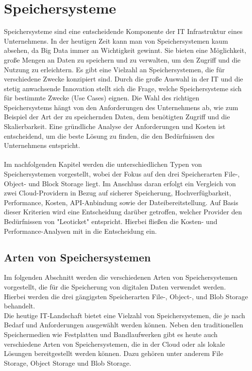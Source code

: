 \chapter{Speichersysteme}

Speichersysteme sind eine entscheidende Komponente der IT Infrastruktur eines Unternehmens. In der heutigen Zeit kann man von Speichersystemen kaum absehen, da Big Data immer an Wichtigkeit gewinnt. Sie bieten eine Möglichkeit, große Mengen an Daten zu speichern und zu verwalten, um den Zugriff und die Nutzung zu erleichtern. Es gibt eine Vielzahl an Speichersystemen, die für verschiedene Zwecke konzipiert sind. Durch die große Auswahl in der IT und die stetig anwachsende Innovation stellt sich die Frage, welche Speichersysteme sich für bestimmte Zwecke (Use Cases) eignen. Die Wahl des richtigen Speichersystems hängt von den Anforderungen des Unternehmens ab, wie zum Beispiel der Art der zu speichernden Daten, dem benötigten Zugriff und die Skalierbarkeit. Eine gründliche Analyse der Anforderungen und Kosten ist entscheidend, um die beste Lösung zu finden, die den Bedürfnissen des Unternehmens entspricht.\\
\\ 
Im nachfolgenden Kapitel werden die unterschiedlichen Typen von Speichersystemen vorgestellt, wobei der Fokus auf den drei Speicherarten File-, Object- und Block Storage liegt. Im Anschluss daran erfolgt ein Vergleich von zwei Cloud-Providern in Bezug auf sicherer Speicherung, Hochverfügbarkeit, Performance, Kosten, API-Anbindung sowie der Dateibereitstellung. Auf Basis dieser Kriterien wird eine Entscheidung darüber getroffen, welcher Provider den Bedürfnissen von "Leoticket" entspricht. Hierbei fließen die Kosten- und Performance-Analysen mit in die Entscheidung ein.

\section{Arten von Speichersystemen}

Im folgenden Abschnitt werden die verschiedenen Arten von Speichersystemen vorgestellt, die für die Speicherung von digitalen Daten verwendet werden. Hierbei werden die drei gängigsten Speicherarten File-, Object-, und Blob Storage behandelt.\\
 
Die heutige IT-Landschaft bietet eine Vielzahl von Speichersystemen, die je nach Bedarf und Anforderungen ausgewählt werden können. Neben den traditionellen Speichermedien wie Festplatten und Bandlaufwerken gibt es heute auch verschiedene Arten von Speichersystemen, die in der Cloud oder als lokale Lösungen bereitgestellt werden können. Dazu gehören unter anderem File Storage, Object Storage und Blob Storage.\\

